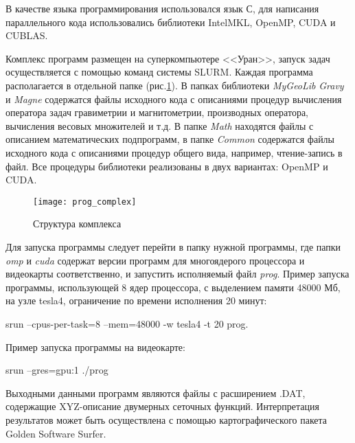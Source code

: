 В качестве языка программирования использовался язык С, для написания параллельного кода использовались библиотеки IntelMKL, OpenMP, CUDA и CUBLAS.

Комплекс программ размещен на суперкомпьютере <<Уран>>, запуск задач осуществляется с помощью команд системы SLURM. Каждая программа  располагается в отдельной папке (рис.\ref{fig:prog_complex}). В папках библиотеки \textit{MyGeoLib} \textit{Gravy} и \textit{Magne} содержатся файлы исходного кода с описаниями процедур вычисления оператора задач гравиметрии и магнитометрии, производных оператора, вычисления весовых множителей и т.д. В папке \textit{Math} находятся файлы с описанием математических подпрограмм, в папке \textit{Common} содержатся файлы исходного кода с описаниями процедур общего вида, например, чтение-запись в файл. Все процедуры библиотеки реализованы в двух вариантах: OpenMP и CUDA. 
\begin{figure}[h]
	\centering
	\texttt{[image: prog\_complex]}
	\caption{Структура комплекса}
	\label{fig:prog_complex}
\end{figure}

Для запуска программы следует перейти в папку нужной программы, где папки \textit{omp} и \textit{cuda} содержат версии программ для многоядерого процессора и видеокарты соответственно, и запустить исполняемый файл \textit{prog}. Пример запуска программы, использующей 8 ядер процессора, с выделением памяти 48000 Мб, на узле tesla4, ограничение по времени исполнения 20 минут:

srun --cpus-per-task=8 --mem=48000 -w tesla4 -t 20 prog.

Пример запуска программы на видеокарте:

srun --gres=gpu:1 ./prog

Выходными данными программ являются файлы с расширением .DAT, содержащие XYZ-описание двумерных сеточных функций. Интерпретация результатов может быть осуществлена с помощью картографического пакета Golden Software Surfer.

